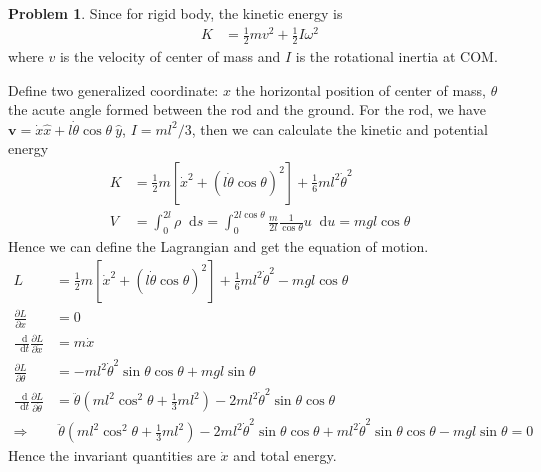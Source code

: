 \documentclass[twoside,11pt]{article}
\newcommand{\lms}{\fontfamily{lmss}\selectfont} %
\renewcommand*\d{\mathop{}\!\mathrm{d}}
\theoremstyle{definition}
\newtheorem{problem}{\lms Problem}
\theoremstyle{remark}
\begin{document}
\begin{problem}
Since for rigid body, the kinetic energy is
\begin{align*}
    K &= \frac{1}{2}mv^2 + \frac{1}{2}I\omega^2
\end{align*}
where $v$ is the velocity of center of mass and $I$ is the rotational inertia at COM.

Define two generalized coordinate: $x$ the horizontal position of center of mass, 
$\theta$ the acute angle formed between the rod and the ground.
For the rod, we have $\mathbf{v}=\dot{x}\hat{x} + l\dot{\theta}\cos\theta~\hat{y}$,
$I = ml^2/3$,
then we can calculate the kinetic and potential energy
\begin{align*}
    K &= \frac{1}{2}m[\dot{x}^2 + (l\dot{\theta}\cos\theta)^2] + \frac{1}{6}ml^2\dot{\theta}^2\\
    V &= \int_0^{2l}\rho\d s = \int_0^{2l\cos\theta}\frac{m}{2l}\frac{1}{\cos\theta} u\d u = mgl\cos\theta
\end{align*}
Hence we can define the Lagrangian and get the equation of motion.
\begin{align*}
    L &= \frac{1}{2}m[\dot{x}^2 + (l\dot{\theta}\cos\theta)^2]
    + \frac{1}{6}ml^2\dot{\theta}^2 - mgl\cos\theta\\
    \frac{\partial L}{\partial x} &= 0\\
    \frac{\d}{\d t}\frac{\partial L}{\partial\dot{x}} &= m\dot{x}\\
    \frac{\partial L}{\partial \theta} &= 
    -ml^2\dot{\theta}^2\sin\theta\cos\theta
    + mgl\sin\theta\\
    \frac{\d}{\d t}\frac{\partial L}{\partial\dot{\theta}} &= 
    \ddot{\theta}\left(
        ml^2\cos^2\theta + \frac{1}{3}ml^2
    \right)
    - 2ml^2\dot{\theta}^2\sin\theta\cos\theta\\
    \Rightarrow
    &~\ddot{\theta}\left(
        ml^2\cos^2\theta + \frac{1}{3}ml^2
    \right)
    - 2ml^2\dot{\theta}^2\sin\theta\cos\theta
    +ml^2\dot{\theta}^2\sin\theta\cos\theta
    - mgl\sin\theta = 0
\end{align*}
Hence the invariant quantities are $\dot{x}$ and total energy.

\end{problem}



\end{document}
